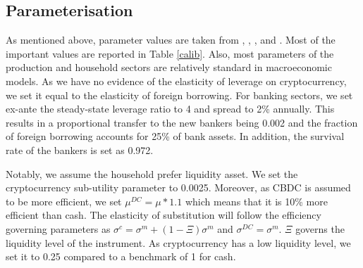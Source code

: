\documentclass[12pt, a4paper]{article}
\begin{document}
\subsection{Parameterisation}
As mentioned above, parameter values are taken from \cite{aoki2016monetary}, \cite{minesso2022central}, \cite{asimakopoulos2019new}, and \cite{murakami2021cryptocurrencies}. Most of the important values are reported in Table \ref{calib}. Also, most parameters of the production and household sectors are relatively standard
in macroeconomic models. As we have no evidence of the elasticity of leverage on cryptocurrency, we set it equal to the elasticity of foreign borrowing. For banking sectors, we set ex-ante the steady-state leverage ratio to 4 and spread to 2\% annually. This results in a proportional transfer to the new bankers being 0.002 and the fraction of foreign borrowing accounts for 25\% of bank assets. In addition, the survival rate of the bankers is set as 0.972.

Notably, we assume the household prefer liquidity asset. We set the cryptocurrency sub-utility parameter to 0.0025. Moreover, as CBDC is assumed to be more efficient, we set $\mu^{DC}= \mu*1.1$ which means that it is 10\% more efficient than cash. The elasticity of substitution will follow the efficiency governing parameters as $\sigma^c= \sigma^m +(1-\Xi)\sigma^m$ and $\sigma^{DC}= \sigma^m $. $\Xi$ governs the liquidity level of the instrument. As cryptocurrency has a low liquidity level, we set it to 0.25 compared to a benchmark of 1 for cash.
\end{document}
